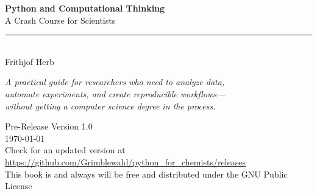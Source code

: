 
\begin{titlepage}
    \centering

    \vspace*{2cm}

    {\Huge\bfseries\color{codeblue} Python and Computational Thinking}\\[1cm]

    {\LARGE A Crash Course for Scientists}\\[2cm]

    \rule{0.6\textwidth}{0.4pt}\\[1.5cm]

    {\Large Frithjof Herb}\\[3cm]

    \vfill

    {\large\itshape
    A practical guide for researchers who need to analyze data,\\
    automate experiments, and create reproducible workflows---\\
    without getting a computer science degree in the process.
    }

    \vfill

    {\large Pre-Release Version 1.0}\\[0.5cm]
    {\large \today}\\[0.5cm]
	{\large Check for an updated version at \url{https://github.com/Grimblewald/python_for_chemists/releases}}\\[0.5cm]
	{\large This book is and always will be free and distributed under the GNU Public License}

\end{titlepage}

\cleardoublepage
